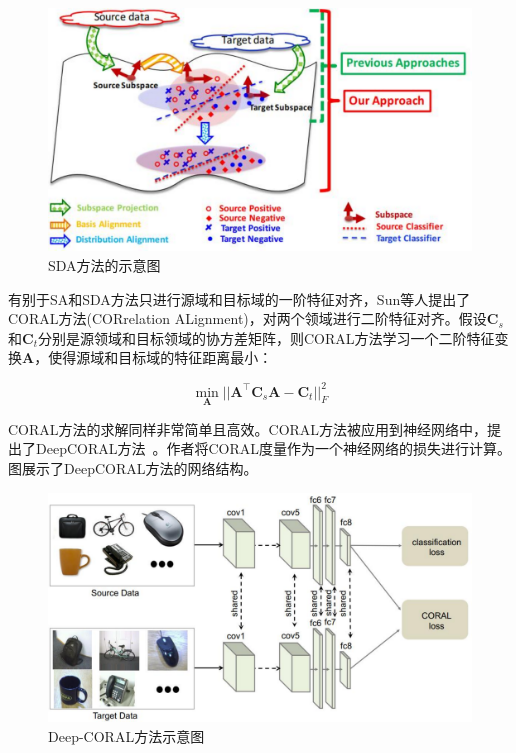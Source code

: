 \begin{figure}[htbp]
	\centering
	\includegraphics[scale=0.6]{./figures/fig-subspace-sda.pdf}
	\caption{SDA方法的示意图}
	\label{fig-subspace-sda}
\end{figure}

有别于SA和SDA方法只进行源域和目标域的一阶特征对齐，Sun等人提出了CORAL方法(CORrelation ALignment)，对两个领域进行二阶特征对齐。假设$\mathbf{C}_s$和$\mathbf{C}_t$分别是源领域和目标领域的协方差矩阵，则CORAL方法学习一个二阶特征变换$\mathbf{A}$，使得源域和目标域的特征距离最小：

\begin{equation}
	\min_\mathbf{A} ||\mathbf{A}^\top \mathbf{C}_s \mathbf{A} - \mathbf{C}_t||^2_F
\end{equation}

CORAL方法的求解同样非常简单且高效。CORAL方法被应用到神经网络中，提出了DeepCORAL方法~\cite{sun2016deep}。作者将CORAL度量作为一个神经网络的损失进行计算。图展示了DeepCORAL方法的网络结构。

\begin{figure}[htbp]
	\centering
	\includegraphics[scale=0.4]{./figures/fig-subspace-deepcoral.pdf}
	\caption{Deep-CORAL方法示意图}
	\label{fig-subspace-deepcoral}
\end{figure}

